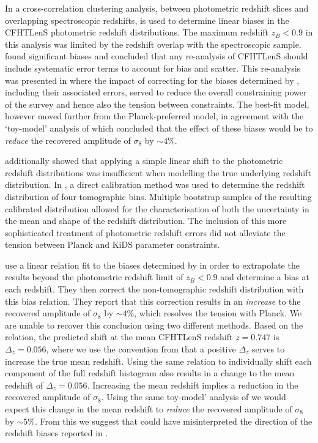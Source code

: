 In \citet{choi/etal:2016} a cross-correlation clustering analysis, between photometric redshift slices and overlapping spectroscopic redshifts, is used to determine linear biases in the CFHTLenS photometric redshift distributions.   The maximum redshift $z_B<0.9$ in this analysis was limited by the redshift overlap with the spectroscopic sample.  \citet{choi/etal:2016} found significant biases and concluded that any re-analysis of CFHTLenS should include systematic error terms to account for bias and scatter.    This re-analysis was presented in \citet{joudaki/etal:2016} where the impact of correcting for the biases determined by \citet{choi/etal:2016}, including their associated errors, served to reduce the overall constraining power of the survey and hence also the tension between constraints.  The best-fit model, however moved further from the Planck-preferred model, in agreement with the `toy-model' analysis of \citet{choi/etal:2016} which concluded that the effect of these biases would be to {\it reduce} the recovered amplitude of $\sigma_8$ by $\sim 4$\%. 

\citet{choi/etal:2016} additionally showed that applying a simple linear shift to the photometric redshift distributions was insufficient when modelling the true underlying redshift distribution.  In \citet{hildebrandt/etal:2016}, a direct calibration method was used to determine the redshift distribution of four tomographic bins.  Multiple bootstrap samples of the resulting calibrated distribution allowed for the characterisation of both the uncertainty in the mean and shape of the redshift distribution.  The inclusion of this more sophisticated treatment of photometric redshift errors did not alleviate the tension between Planck and KiDS parameter constraints.

\cite{kitching/etal:2016} use a linear relation fit to the biases determined by \citet{choi/etal:2016} in order to extrapolate the results beyond the photometric redshift limit of $z_B<0.9$ and determine a bias at each redshift.  They then correct the non-tomographic \citet{kilbinger/etal:2013} redshift distribution with this bias relation.  They report that this correction results in an {\it increase} to the recovered amplitude of $\sigma_8$ by $\sim 4$\%, which resolves the tension with Planck.   We are unable to recover this conclusion using two different methods.   Based on the \cite{kitching/etal:2016} relation, the predicted shift at the mean CFHTLenS redshift $z=0.747$ is $\Delta_z = 0.056$, where we use the convention from \citet{choi/etal:2016} that a positive $\Delta_z$ serves to increase the true mean redshift.  Using the same relation to individually shift each component of the full \citet{kilbinger/etal:2013} redshift histogram also results in a change to the mean redshift of $\Delta_z = 0.056$.  Increasing the mean redshift implies a reduction in the recovered amplitude of $\sigma_8$.  Using the same toy-model' analysis of \citet{choi/etal:2016} we would expect this change in the mean redshift to {\it reduce} the recovered amplitude of $\sigma_8$ by $\sim 5$\%.    From this we suggest that \cite{kitching/etal:2016} could have misinterpreted the direction of the redshift biases reported in \citet{choi/etal:2016}. 



 